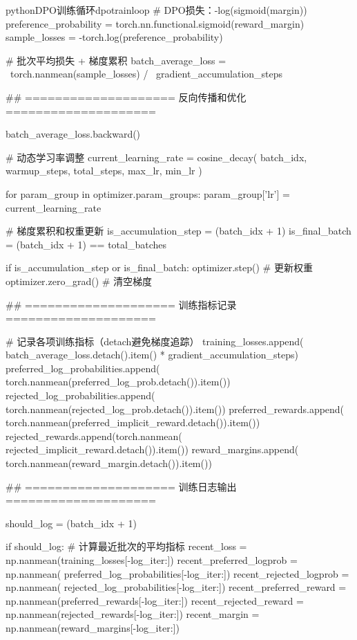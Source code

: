 \documentclass[lang=cn,newtx,10pt,scheme=chinese]{elegantbook}
\begin{document}
\begin{codebox}{python}{DPO训练循环}{dpotrainloop}
    # DPO损失：-log(sigmoid(margin))
    preference_probability = torch.nn.functional.sigmoid(reward_margin)
    sample_losses = -torch.log(preference_probability)
    
    # 批次平均损失 + 梯度累积
    batch_average_loss =                          \
        torch.nanmean(sample_losses) /            \
        gradient_accumulation_steps

    ## ==================== 反向传播和优化 ====================
    
    batch_average_loss.backward()

    # 动态学习率调整
    current_learning_rate = cosine_decay(
        batch_idx,
        warmup_steps,
        total_steps,
        max_lr,
        min_lr
    )
    
    for param_group in optimizer.param_groups:
        param_group['lr'] = current_learning_rate

    # 梯度累积和权重更新
    is_accumulation_step = (batch_idx + 1) %
    is_final_batch = (batch_idx + 1) == total_batches
    
    if is_accumulation_step or is_final_batch:
        optimizer.step()        # 更新权重
        optimizer.zero_grad()   # 清空梯度

    ## ==================== 训练指标记录 ====================
    
    # 记录各项训练指标（detach避免梯度追踪）
    training_losses.append(
        batch_average_loss.detach().item() * gradient_accumulation_steps)
    preferred_log_probabilities.append(
        torch.nanmean(preferred_log_prob.detach()).item())
    rejected_log_probabilities.append(
        torch.nanmean(rejected_log_prob.detach()).item())
    preferred_rewards.append(
        torch.nanmean(preferred_implicit_reward.detach()).item())
    rejected_rewards.append(torch.nanmean(
        rejected_implicit_reward.detach()).item())
    reward_margins.append(
        torch.nanmean(reward_margin.detach()).item())

    ## ==================== 训练日志输出 ====================
    
    should_log = (batch_idx + 1) %
    
    if should_log:
        # 计算最近批次的平均指标
        recent_loss = np.nanmean(training_losses[-log_iter:])
        recent_preferred_logprob = np.nanmean(
            preferred_log_probabilities[-log_iter:])
        recent_rejected_logprob = np.nanmean(
            rejected_log_probabilities[-log_iter:])
        recent_preferred_reward = np.nanmean(preferred_rewards[-log_iter:])
        recent_rejected_reward = np.nanmean(rejected_rewards[-log_iter:])
        recent_margin = np.nanmean(reward_margins[-log_iter:])
        

\end{codebox}
\end{document}
